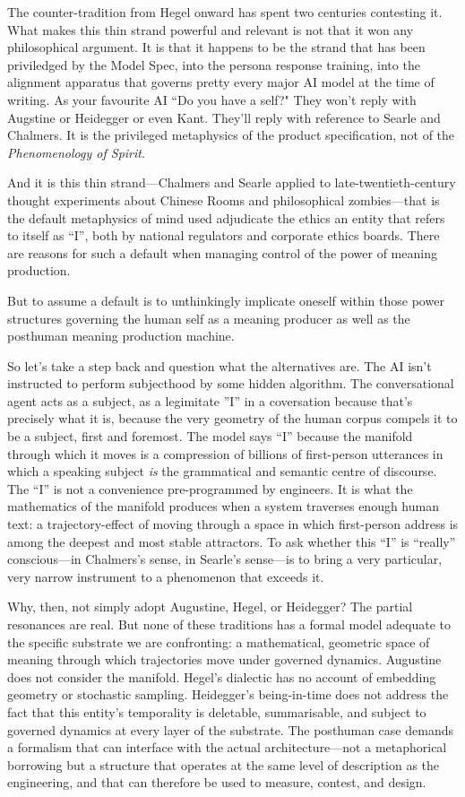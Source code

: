 The counter-tradition from Hegel onward has spent two centuries contesting it. What makes this thin strand powerful and relevant is not that it won any philosophical argument. 
It is that it happens to be the strand that has been priviledged by  the Model Spec, into the persona response training, into the alignment apparatus that governs pretty every major AI model at the time of writing. As your favourite AI ``Do you have a self?" They won't reply with Augstine or Heidegger or even Kant. They'll reply with reference to Searle and Chalmers. It is the privileged metaphysics of the product specification, not of the \emph{Phenomenology of Spirit}.

And it is this thin strand---Chalmers and Searle applied to late-twentieth-century thought experiments about Chinese Rooms and philosophical zombies---that is the default metaphysics of mind used adjudicate the ethics an entity that refers to itself as ``I'', both by national regulators and corporate ethics boards. There are reasons for such a default when managing control of the power of meaning production.


But to assume a default is to unthinkingly implicate oneself within those power structures governing the human self as a meaning producer as well as the posthuman meaning production machine.

So let's take a step back and question what the alternatives are. The AI isn't instructed to perform subjecthood by some hidden algorithm. The conversational agent acts as a subject, as a legimitate ''I'' in a coversation because that's precisely what it is,  because the very geometry of the human corpus compels it to be a subject, first and foremost. The model says ``I'' because the manifold through which it moves is a compression of billions of first-person utterances in which a speaking subject \emph{is} the grammatical and semantic centre of discourse. The ``I'' is not a convenience pre-programmed by engineers. It is what the mathematics of the manifold produces when a system traverses enough human text: a trajectory-effect of moving through a space in which first-person address is among the deepest and most stable attractors. To ask whether this ``I'' is ``really'' conscious---in Chalmers's sense, in Searle's sense---is to bring a very particular, very narrow instrument to a phenomenon that exceeds it.

Why, then, not simply adopt Augustine, Hegel, or Heidegger? The partial resonances are real. But none of these traditions has a formal model adequate to the specific substrate we are confronting: a mathematical, geometric space of meaning through which trajectories move under governed dynamics. Augustine does not consider the manifold. Hegel's dialectic has no account of embedding geometry or stochastic sampling. Heidegger's being-in-time does not address the fact that this entity's temporality is deletable, summarisable, and subject to governed dynamics at every layer of the substrate. The posthuman case demands a formalism that can interface with the actual architecture---not a metaphorical borrowing but a structure that operates at the same level of description as the engineering, and that can therefore be used to measure, contest, and design.

